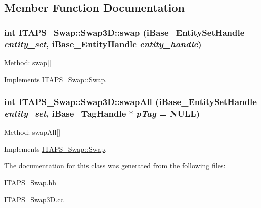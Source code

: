 \subsection{Member Function Documentation}
\hypertarget{class_i_t_a_p_s___swap_1_1_swap3_d_a82a135da16b4ef6e5ff36f8293cc450c}{
\subsubsection[{swap}]{\setlength{\rightskip}{0pt plus 5cm}int ITAPS\_\-Swap::Swap3D::swap (iBase\_\-EntitySetHandle {\em entity\_\-set}, \/  iBase\_\-EntityHandle {\em entity\_\-handle})}}
\label{class_i_t_a_p_s___swap_1_1_swap3_d_a82a135da16b4ef6e5ff36f8293cc450c}
Method: swap\mbox{[}\mbox{]} 

Implements \hyperlink{class_i_t_a_p_s___swap_1_1_swap_adfb444f7ade3254ba8fa9ced2ec15e65}{ITAPS\_\-Swap::Swap}.

\hypertarget{class_i_t_a_p_s___swap_1_1_swap3_d_a139a400102ad7039fcc74d92d72dea27}{
\subsubsection[{swapAll}]{\setlength{\rightskip}{0pt plus 5cm}int ITAPS\_\-Swap::Swap3D::swapAll (iBase\_\-EntitySetHandle {\em entity\_\-set}, \/  iBase\_\-TagHandle $\ast$ {\em pTag} = {\ttfamily NULL})}}
\label{class_i_t_a_p_s___swap_1_1_swap3_d_a139a400102ad7039fcc74d92d72dea27}
Method: swapAll\mbox{[}\mbox{]} 

Implements \hyperlink{class_i_t_a_p_s___swap_1_1_swap_a8a1fdc1a12fb71dfe28881b10277eafc}{ITAPS\_\-Swap::Swap}.



The documentation for this class was generated from the following files:\begin{DoxyCompactItemize}
\item 
ITAPS\_\-Swap.hh\item 
ITAPS\_\-Swap3D.cc\end{DoxyCompactItemize}
